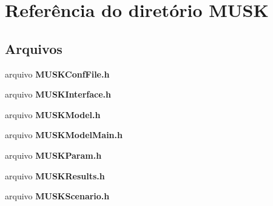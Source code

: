 \section{Referência do diretório M\+U\+SK}
\label{dir_bcdab91dd1f0f6bd030907cc7b33c048}
\subsection*{Arquivos}
\begin{DoxyCompactItemize}
\item 
arquivo {\bf M\+U\+S\+K\+Conf\+File.\+h}
\item 
arquivo {\bf M\+U\+S\+K\+Interface.\+h}
\item 
arquivo {\bf M\+U\+S\+K\+Model.\+h}
\item 
arquivo {\bf M\+U\+S\+K\+Model\+Main.\+h}
\item 
arquivo {\bf M\+U\+S\+K\+Param.\+h}
\item 
arquivo {\bf M\+U\+S\+K\+Results.\+h}
\item 
arquivo {\bf M\+U\+S\+K\+Scenario.\+h}
\end{DoxyCompactItemize}
